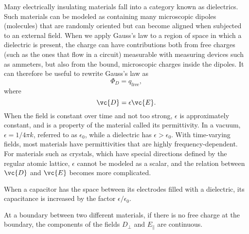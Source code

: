Many electrically insulating materials fall into a category known
as dielectrics. Such materials can be modeled as containing many
microscopic dipoles (molecules) that are randomly oriented but can
become aligned when subjected to an external field. When we apply
Gauss's law to a region of space in which a dielectric is present,
the charge can have contributions both from free charges (such
as the ones that flow in a circuit) measurable with measuring devices
such as ammeters, but also from the bound, microscopic charges inside
the dipoles. It can therefore be useful to rewrite Gauss's law as
\begin{equation*}
  \Phi_D = q_{\text{free}},
\end{equation*}
where
\begin{equation*}
  \vc{D}=\epsilon \vc{E} .
\end{equation*}
When the field is constant over time and not too strong, $\epsilon$ is approximately constant,
and is a property of the material called its permittivity. In a vacuum, $\epsilon=1/4\pi k$,
referred to as $\epsilon_0$, while a dielectric has $\epsilon>\epsilon_0$.
With time-varying fields, most materials have permittivities that are highly frequency-dependent.
For materials such as crystals, which have special directions defined by the regular atomic lattice,
$\epsilon$ cannot be modeled as a scalar, and the relation between $\vc{D}$ and $\vc{E}$ becomes
more complicated.

When a capacitor has the space between its electrodes filled with a dielectric,
its capacitance is increased by the factor $\epsilon/\epsilon_0$.

At a boundary between two different materials, if there is no free charge at the boundary,
the components of the fields $D_\perp$ and $E_\parallel$ are continuous.
